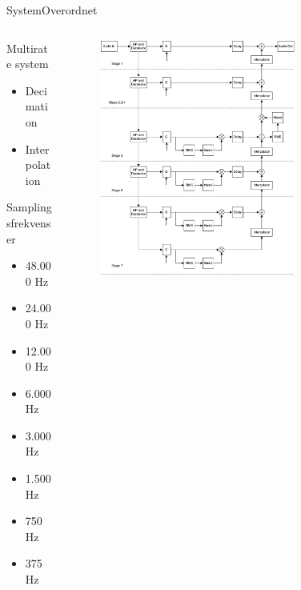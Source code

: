 \begin{frame}{System}{Overordnet}
\begin{columns}
\begin{column}{0.35\textwidth}
Multirate system
\begin{itemize}
\item Decimation
\item Interpolation
\end{itemize}
\vspace{5mm}
Samplingsfrekvenser
\begin{itemize}
\item 48.000 Hz
\item 24.000 Hz
\item 12.000 Hz
\item 6.000 Hz
\item 3.000 Hz
\item 1.500 Hz
\item 750 Hz
\item 375 Hz
\end{itemize}
\end{column}
\begin{column}{0.6\textwidth}
\begin{figure}[H]
\centering
\includegraphics[width=0.7\textwidth]{designRealFullFinalProduct.pdf}
\end{figure}
\end{column}
\end{columns}
\end{frame}


